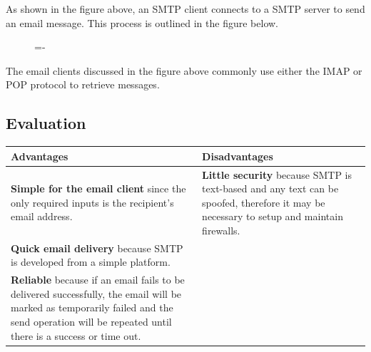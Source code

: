 \documentclass[a4paper]{systems-software}
\begin{document}
As shown in the figure above, an SMTP client connects to a SMTP server to send an email message. This process is outlined in the figure below.

\begin{figure}[H]
	\lineskip=-\fboxrule
\end{figure}

The email clients discussed in the figure above commonly use either the IMAP or POP protocol to retrieve messages.


\subsection*{Evaluation}

\begin{longtabu} to \textwidth {| X[1,l] | X[1,l] |}
	\hline
	\textbf{Advantages} & \textbf{Disadvantages}
	\\ \hline
	\textbf{Simple for the email client} since the only required inputs is the recipient’s email address. &
	\textbf{Little security} because SMTP is text-based and any text can be spoofed, therefore it may be necessary to setup and maintain firewalls.
	\\ \hline
	\textbf{Quick email delivery} because SMTP is developed from a simple platform. &
	\\ \hline
	\textbf{Reliable} because if an email fails to be delivered successfully, the email will be marked as temporarily failed and the send operation will be repeated until there is a success or time out. &
	\\ \hline
\end{longtabu}
\end{document}
